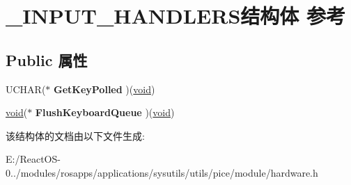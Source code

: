 \hypertarget{struct___i_n_p_u_t___h_a_n_d_l_e_r_s}{}\section{\+\_\+\+I\+N\+P\+U\+T\+\_\+\+H\+A\+N\+D\+L\+E\+R\+S结构体 参考}
\label{struct___i_n_p_u_t___h_a_n_d_l_e_r_s}
\subsection*{Public 属性}
\begin{DoxyCompactItemize}
\item 
\mbox{\label{struct___i_n_p_u_t___h_a_n_d_l_e_r_s_acd1be1c9841e3c0f48407b30401cd9ec}} 
U\+C\+H\+AR($\ast$ {\bfseries Get\+Key\+Polled} )(\hyperlink{interfacevoid}{void})
\item 
\mbox{\label{struct___i_n_p_u_t___h_a_n_d_l_e_r_s_a5cddcfa63fc2675abf4e0c63efa84c8b}} 
\hyperlink{interfacevoid}{void}($\ast$ {\bfseries Flush\+Keyboard\+Queue} )(\hyperlink{interfacevoid}{void})
\end{DoxyCompactItemize}


该结构体的文档由以下文件生成\+:\begin{DoxyCompactItemize}
\item 
E\+:/\+React\+O\+S-\/0../modules/rosapps/applications/sysutils/utils/pice/module/hardware.\+h\end{DoxyCompactItemize}
